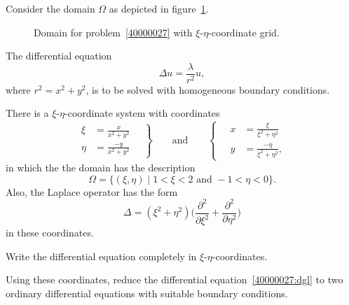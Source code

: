 Consider the domain $\Omega$ as depicted in figure~\ref{40000027:domain}.
\begin{figure}[h]
\centering
{}
\caption{Domain for problem~\ref{40000027} with $\xi$-$\eta$-coordinate
grid.
\label{40000027:domain}}
\end{figure}
The differential equation
\begin{equation}
\Delta u = \frac{\lambda}{r^2} u,
\label{40000027:dgl}
\end{equation}
where $r^2= x^2 +y^2$, is to be solved with homogeneous boundary
conditions.

There is a $\xi$-$\eta$-coordinate system with coordinates
\[
\left.
\begin{aligned}
\xi  &= \frac{ x}{x^2+y^2}\\
\eta &= \frac{-y}{x^2+y^2}
\end{aligned}
\quad\right\}
\qquad\text{and}\qquad
\left\{\quad
\begin{aligned}
x &= \frac{\xi}{\xi^2+\eta^2}\\
y &= \frac{-\eta}{\xi^2+\eta^2},
\end{aligned}
\right.
\]
in which the the domain has the description
\begin{equation}
\Omega
=
\{ (\xi,\eta)\mid 1<\xi<2\text{ and } -1< \eta< 0\}.
\label{40000027:domainxieta}
\end{equation}
Also, the Laplace operator has the form
\[
\Delta
=
(\xi^2+\eta^2)
\biggl(\frac{\partial^2}{\partial \xi^2}
+
\frac{\partial^2}{\partial \eta^2}\biggr)
\]
in these coordinates.
\begin{teilaufgaben}
\item
Write the differential equation completely in $\xi$-$\eta$-coordinates.
\item
Using these coordinates, reduce the differential equation~\eqref{40000027:dgl}
to two ordinary differential equations with suitable boundary conditions.
\end{teilaufgaben}

